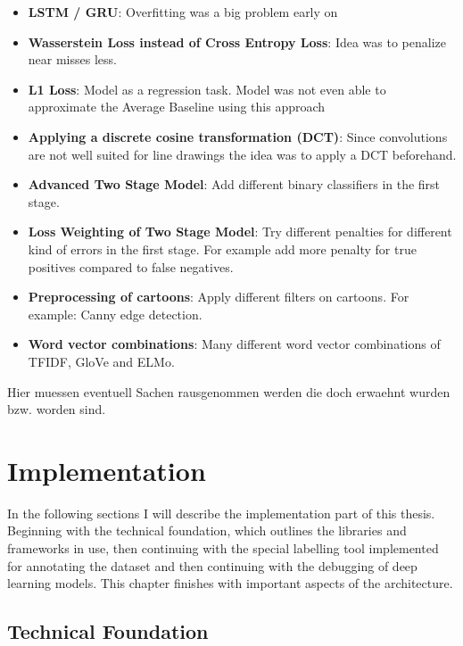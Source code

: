 \documentclass[draft,final,oneside]{vutinfth} %
\begin{document}
\begin{itemize}
\item \textbf{LSTM / GRU}: Overfitting was a big problem early on
\item \textbf{Wasserstein Loss instead of Cross Entropy Loss}: Idea was to penalize near misses less.
\item \textbf{L1 Loss}: Model as a regression task. Model was not even able to approximate the Average Baseline using this approach
\item \textbf{Applying a discrete cosine transformation (DCT)}: Since convolutions are not well suited for line drawings the idea was to apply a DCT beforehand. 
\item \textbf{Advanced Two Stage Model}: Add different binary classifiers in the first stage.
\item \textbf{Loss Weighting of Two Stage Model}: Try different penalties for different kind of errors in the first stage. For example add more penalty for true positives compared to false negatives.
\item \textbf{Preprocessing of cartoons}: Apply different filters on cartoons. For example: Canny edge detection.
\item \textbf{Word vector combinations}: Many different word vector combinations of TFIDF, GloVe and ELMo. 
\end{itemize}

Hier muessen eventuell Sachen rausgenommen werden die doch erwaehnt wurden bzw. worden sind.
\fi

\chapter{Implementation} \label{implementationchapter}

In the following sections I will describe the implementation part of this thesis. Beginning with the technical foundation, which outlines the libraries and frameworks in use, then continuing with the special labelling tool implemented for annotating the dataset and then continuing with the debugging of deep learning models. This chapter finishes with important aspects of the architecture.

\section{Technical Foundation}

\end{document}
